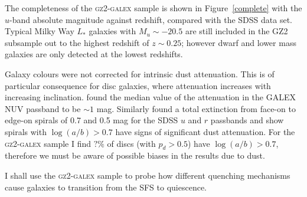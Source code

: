 The completeness of the \textsc{gz2-galex} sample is shown in Figure~\ref{complete} with the $u$-band absolute magnitude against redshift, compared with the SDSS data set. Typical Milky Way $L_*$ galaxies with $M_u \sim -20.5$ are still included in the GZ2 subsample out to the highest redshift of $z \sim 0.25$; however dwarf and lower mass galaxies are only detected at the lowest redshifts.

Galaxy colours were not corrected for intrinsic dust attenuation. This is of particular consequence for disc galaxies, where attenuation increases with increasing inclination. \cite{Buat05} found the median value of the attenuation in the GALEX NUV passband to be $\sim 1$ mag. Similarly \cite{masters10a} found a total extinction from face-on to edge-on spirals of 0.7 and 0.5 mag for the SDSS $u$ and $r$ passbands and show spirals with $\log(a/b) > 0.7$ have signs of significant dust attenuation. For the \textsc{gz2-galex} sample I find $?\%$ of discs (with $p_d > 0.5$) have $\log(a/b) > 0.7$, therefore we must be aware of possible biases in the results due to dust. 

I shall use the \textsc{gz2-galex} sample to probe how different quenching mechanisms cause galaxies to transition from the SFS to quiescence. 

